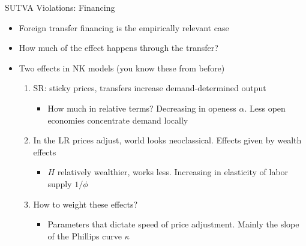 \documentclass[english,xcolor=svgnames]{beamer}
\begin{document}
\begin{frame}{SUTVA Violations: Financing}
\begin{itemize}
\item Foreign transfer financing is the empirically relevant case \\ \begin{footnotesize}{\color{gray}{Spending happens locally, but financed at the federal level $OEM - PF$}} \end{footnotesize}
\item How much of the effect happens through the transfer?
\\ \begin{footnotesize}{\color{gray}{Size of the transfer is key. Increasing on $\rho_g$}} \end{footnotesize}
\item Two effects in NK models (you know these from before)
\begin{enumerate}
\item SR: sticky prices, transfers increase demand-determined output
\begin{itemize}
\item How much in relative terms? Decreasing in openess $\alpha$. Less open economies concentrate demand locally
\end{itemize}
\item In the LR prices adjust, world looks neoclassical. Effects given by wealth effects
\begin{itemize}
\item $H$ relatively wealthier, works less. Increasing in elasticity of labor supply $1/\phi$
\end{itemize}
\item How to weight these effects?
\begin{itemize}
\item Parameters that dictate speed of price adjustment. Mainly the slope of the Phillips curve $\kappa$
\end{itemize}
\end{enumerate}
\end{itemize}
\end{frame}

%
\end{document}
